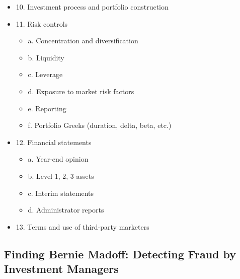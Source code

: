 \begin{itemize}
\begin{itemize}
    \end{itemize}
\item 10. Investment process and portfolio construction
\item 11. Risk controls
    \begin{itemize}
    \item a. Concentration and diversification
    \item b. Liquidity
    \item c. Leverage
    \item d. Exposure to market risk factors
    \item e. Reporting
    \item f. Portfolio Greeks (duration, delta, beta, etc.)
    \end{itemize}
\item 12. Financial statements
    \begin{itemize}
    \item a. Year-end opinion
    \item b. Level 1, 2, 3 assets
    \item c. Interim statements
    \item d. Administrator reports
    \end{itemize}
    
\item 13. Terms and use of third-party marketers
\end{itemize}




\subsection{Finding Bernie Madoff: Detecting Fraud by Investment Managers}



